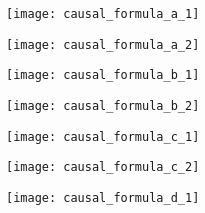 \begin{figure}[htbp]
  \centering
  \begin{subfigure}{0.55\textwidth}
  	\centering
  	\begin{minipage}[b]{1\textwidth}
  	  \centering
  	  \texttt{[image: causal\_formula\_a\_1]}
  	\end{minipage}
  	\begin{minipage}[b]{1\textwidth}
  	  \vspace{1em}
  	  \centering
  	  \texttt{[image: causal\_formula\_a\_2]}
  	\end{minipage}
  	\caption{}
  	\label{fig:causal_formula_a}
  \end{subfigure}
  \begin{subfigure}{0.55\textwidth}
  	\centering
  	\begin{minipage}[b]{1\textwidth}
  	  \centering
  	  \texttt{[image: causal\_formula\_b\_1]}
  	\end{minipage}
  	\begin{minipage}[b]{1\textwidth}
  	  \vspace{1em}
  	  \centering
  	  \texttt{[image: causal\_formula\_b\_2]}
  	\end{minipage}
  	\caption{}
  	\label{fig:causal_formula_b}
  \end{subfigure}
  \begin{subfigure}{0.7\textwidth}
  	\vspace{1em}
  	\centering
  	\begin{minipage}[b]{1\textwidth}
  	  \centering
  	  \texttt{[image: causal\_formula\_c\_1]}
  	\end{minipage}
  	\begin{minipage}[b]{1\textwidth}
  	  \vspace{1em}
  	  \centering
  	  \texttt{[image: causal\_formula\_c\_2]}
  	\end{minipage}
  	\caption{}
  	\label{fig:causal_formula_c}
  \end{subfigure}
  \begin{subfigure}{0.85\textwidth}
  	\vspace{1em}
  	\centering
  	\begin{minipage}[b]{1\textwidth}
  	  \centering
  	  \texttt{[image: causal\_formula\_d\_1]}
  	\end{minipage}
  	\begin{minipage}[b]{1\textwidth}
  	  \vspace{1em}

\end{minipage}
\end{subfigure}
\end{figure}
